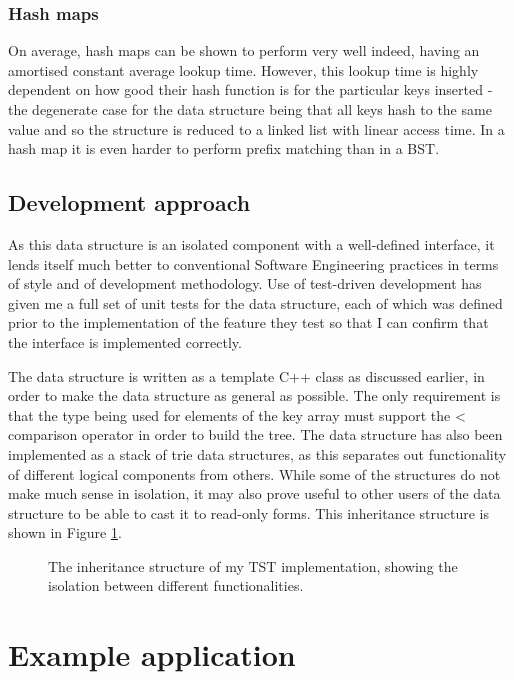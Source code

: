 \documentclass[a4paper,12pt,twoside,openright]{report}
\begin{document}
	\subsubsection{Hash maps}
	
	On average, hash maps can be shown to perform very well indeed, having an amortised constant average lookup time. However, this lookup time is highly dependent on how good their hash function is for the particular keys inserted - the degenerate case for the data structure being that all keys hash to the same value and so the structure is reduced to a linked list with linear access time. In a hash map it is even harder to perform prefix matching than in a BST.
	
	\subsection{Development approach}
	
	As this data structure is an isolated component with a well-defined interface, it lends itself much better to conventional Software Engineering practices in terms of style and of development methodology. Use of test-driven development has given me a full set of unit tests for the data structure, each of which was defined prior to the implementation of the feature they test so that I can confirm that the interface is implemented correctly.
	
	The data structure is written as a template C++ class as discussed earlier, in order to make the data structure as general as possible. The only requirement is that the type being used for elements of the key array must support the < comparison operator in order to build the tree. The data structure has also been implemented as a stack of trie data structures, as this separates out functionality of different logical components from others. While some of the structures do not make much sense in isolation, it may also prove useful to other users of the data structure to be able to cast it to read-only forms. This inheritance structure is shown in Figure \ref{fig:RbtTrie-inheritance}.
	
	\begin{figure}
		\label{fig:RbtTrie-inheritance}
		\caption{The inheritance structure of my TST implementation, showing the isolation between different functionalities.}
	\end{figure}
	
	\section{Example application}
	
\end{document}
